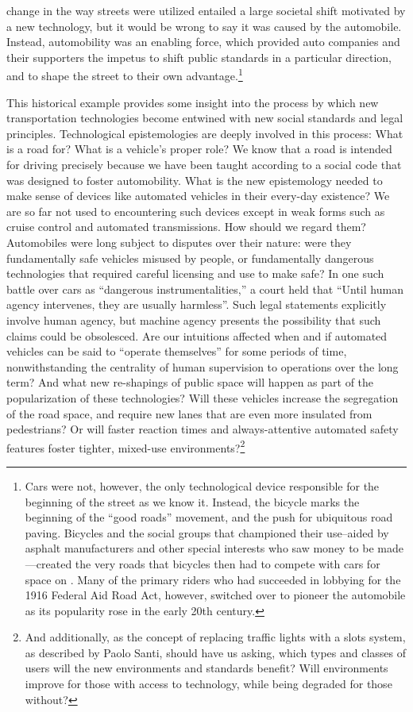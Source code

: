 change in the way streets were utilized entailed a large societal
shift motivated by a new technology, but it would be wrong to say it
was caused by the automobile. Instead, automobility was an enabling
force, which provided auto companies and their supporters the impetus
to shift public standards in a particular direction, and to shape the
street to their own advantage.\footnote{Cars were not, however, the
  only technological device responsible for 
the beginning of the street as we know it. Instead, the bicycle marks the
beginning of the ``good roads'' movement, and the push for ubiquitous
road
paving\cite{???-http://www.vox.com/2015/3/19/8253035/roads-cyclists-cars-history}.
Bicycles and the social groups that championed their use--aided by
asphalt manufacturers and other special interests who saw money to be made---created the
very roads that bicycles then had to compete with cars for space on
\cite{???-vox2}. Many of the primary riders who had succeeded in lobbying for
the 1916 Federal Aid Road Act, however, switched over to pioneer the
automobile as its popularity rose in the early 20th century.} 

This historical
example provides some insight into the process by which new
transportation technologies become entwined with new social standards
and legal principles. Technological epistemologies are deeply involved
in this process: What is a road for? What is a vehicle's
proper role? We know that a road is intended for driving precisely
because we have been taught according to a social code that was
designed to foster automobility. What is the new epistemology needed
to make sense of devices like 
automated vehicles in their every-day existence? We are so far not
used to encountering such devices
except in weak forms such as cruise control and automated
transmissions. How should we regard them?
Automobiles were long subject to disputes over their nature: were they
fundamentally safe vehicles misused by people, or fundamentally
dangerous technologies that required careful licensing and use to
make safe? In one such battle over cars as ``dangerous
instrumentalities,'' a court held that ``Until human agency intervenes, they are usually
harmless''\cite[p. 10]{???-lochlannjain}. Such legal statements
explicitly involve human agency, but machine agency presents the
possibility that such claims could be obsolesced. Are our intuitions
affected when and if automated vehicles can be said to ``operate
themselves'' for some periods of time, nonwithstanding the centrality
of human supervision to operations over the long term?
And what new re-shapings of public space will happen as part of the 
popularization of these technologies? Will these vehicles increase the
segregation of the road space, and require new lanes that are even
more insulated from pedestrians? Or will faster reaction times and
always-attentive automated safety features foster tighter, mixed-use
environments?\footnote{And additionally, as the concept of replacing traffic
lights with a slots system, as described by Paolo Santi, should have
us asking, which types and classes of users will the new environments
and standards benefit? Will environments improve for those with access
to technology, while being degraded for those without?}

